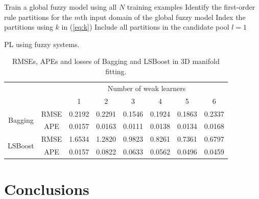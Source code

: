 \documentclass[journal,twocolumn]{IEEEtran}
\begin{document}
\begin{algorithm}[htbp]
Train a global fuzzy model using all $N$ training examples\;
{Identify the first-order rule partitions for the $m$th input domain of the global fuzzy model\;}
Index the partitions using $k$ in (\ref{eq:k})\;
Include all partitions in the candidate pool\;
$l=1$\;
\caption{PL using fuzzy systems.} \label{alg:PLFS}
\end{algorithm}



\begin{table}[h] \centering \setlength{\tabcolsep}{1.5mm}
\caption{RMSEs, APEs and losses of Bagging and LSBoost in 3D manifold fitting.}   \label{tab:E3}
\begin{tabular}{c|c|cccccc}   \hline
 & & \multicolumn{6}{c}{Number of weak learners}\\ \cline{3-8}
&  & 1 & 2 & 3 &4 &5 & 6\\ \hline
\multirow{2}{*}{Bagging}&RMSE & 0.2192 &   0.2291 &   0.1546  &  0.1924 & 0.1863 & 0.2337\\
&APE & 0.0157 &   0.0163 &   0.0111 &   0.0138 & 0.0134 & 0.0168\\ \hline
\multirow{2}{*}{LSBoost}&RMSE & 1.6534 &   1.2820 &   0.9823  &  0.8261 & 0.7361 & 0.6797\\
&APE & 0.0157 &    0.0822 &   0.0633 & 0.0562 & 0.0496 & 0.0459\\ \hline
\end{tabular}
\end{table}



\section{Conclusions} \label{sect:conclusion}
\end{document}
